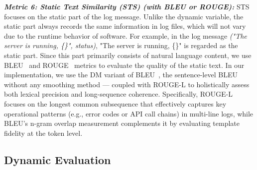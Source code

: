  \textit{\textbf{Metric 6: Static Text Similarity (STS) (with BLEU or ROUGE):}} 
 STS focuses on the static part of the log message. Unlike the dynamic variable, the static part always records the same information in log files, which will not vary due to the runtime behavior of software. For example, in the log message \textit{("The server is running, \{\}", status)}, "The server is running, \{\}" is regarded as the static part.
 Since this part primarily consists of natural language content, we use BLEU~\cite{Papineni2002BleuAM} and ROUGE~\cite{Lin2004ROUGEAP} metrics to evaluate the quality of the static text.
 In our implementation, we use the DM variant of BLEU~\cite{Chen2014ASC, Shi2021OnTE}, \ie the sentence-level BLEU without any smoothing method — coupled with ROUGE-L to holistically assess both lexical precision and long-sequence coherence. Specifically, ROUGE-L focuses on the longest common subsequence that effectively captures key operational patterns (e.g., error codes or API call chains) in multi-line logs, while BLEU's n-gram overlap measurement complements it by evaluating template fidelity at the token level.


 

\subsection{Dynamic Evaluation}

\label{sec:method:dynamic_evaluation}
